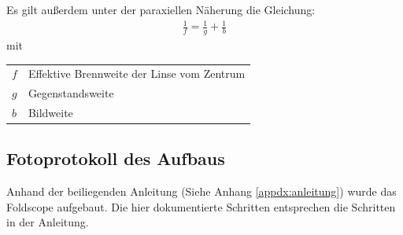 		Es gilt außerdem unter der paraxiellen Näherung die Gleichung:
		\begin{align}
			\frac{1}{f} = \frac{1}{g} + \frac{1}{b}
		\end{align}
		mit \hspace{1cm}
		\begin{tabular}{ll}
			$f$   & Effektive Brennweite der Linse vom Zentrum \\
			$g$   & Gegenstandsweite \\
			$b$   & Bildweite
		\end{tabular}

	\subsection{Fotoprotokoll des Aufbaus}
		Anhand der beiliegenden Anleitung (Siehe Anhang \ref{appdx:anleitung}) wurde das Foldscope aufgebaut. Die hier dokumentierte Schritten entsprechen die Schritten in der Anleitung.
		\vfill
